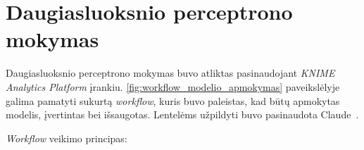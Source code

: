 \section{Daugiasluoksnio perceptrono mokymas}
\label{sec:daugiasluoksnio_perceptrono_mokymas}

Daugiasluoksnio perceptrono mokymas buvo atliktas pasinaudojant \textit{KNIME Analytics Platform} \cite{KNIME} įrankiu. \ref{fig:workflow_modelio_apmokymas} paveikslėlyje galima pamatyti sukurtą \textit{workflow}, kuris buvo paleistas, kad būtų apmokytas modelis, įvertintas bei išsaugotas. Lentelėms užpildyti buvo pasinaudota Claude~\cite{claude_bendrai}.



\textit{Workflow} veikimo principas:



